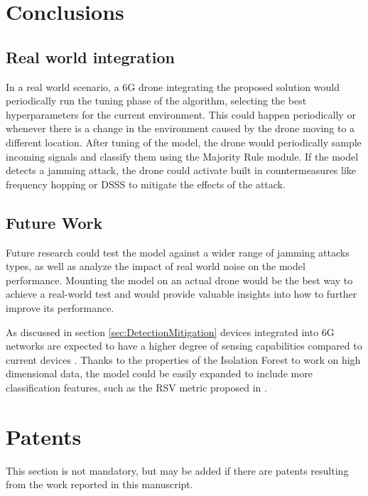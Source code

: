 \documentclass[futureinternet,article,submit,pdftex,moreauthors]{Definitions/mdpi}
\begin{document}
\section{Conclusions}

\subsection{Real world integration}

In a real world scenario, a 6G drone integrating the proposed solution would periodically run the tuning phase of the algorithm, selecting the best hyperparameters for the current environment. This could happen periodically or whenever there is a change in the environment caused by the drone moving to a different location. 
After tuning of the model, the drone would periodically sample incoming signals and classify them using the Majority Rule module. If the model detects a jamming attack, the drone could activate built in countermeasures like frequency hopping or DSSS to mitigate the effects of the attack. 

\subsection{Future Work}

Future research could test the model against a wider range of jamming attacks types, as well as analyze the impact of real world noise on the model performance.
Mounting the model on an actual drone would be the best way to achieve a real-world test and would provide valuable insights into how to further improve its performance.

As discussed in section \ref{sec:DetectionMitigation} devices integrated into 6G networks are expected to have a higher degree of sensing capabilities compared to current devices \cite{6GRoadmapLetaief}. Thanks to the properties of the Isolation Forest to work on high dimensional data, the model could be easily expanded to include more classification features, such as the RSV metric proposed in \cite{JammingDetectionIoT-Hussain}.


\section{Patents}

This section is not mandatory, but may be added if there are patents resulting from the work reported in this manuscript.
\end{document}
